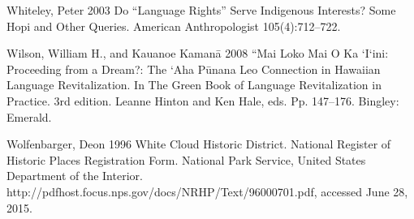 \documentclass[output=paper]{LSP/langsci}
\begin{document}
\begin{reflist}
Whiteley, Peter 2003 Do ``Language Rights'' Serve Indigenous Interests? Some Hopi and Other Queries. American Anthropologist 105(4):712--722.

Wilson, William H., and Kauanoe Kaman\=a 2008 ``Mai Loko Mai O Ka `I`ini: Proceeding from a Dream?: The `Aha P\=unana Leo Connection in Hawaiian Language Revitalization. In The Green Book of Language Revitalization in Practice. 3rd edition. Leanne Hinton and Ken Hale, eds. Pp. 147--176. Bingley: Emerald.

Wolfenbarger, Deon 1996 White Cloud Historic District. National Register of Historic Places Registration Form. National Park Service, United States Department of the Interior. http://pdfhost.focus.nps.gov/docs/NRHP/Text/96000701.pdf, accessed June 28, 2015.

\end{reflist}


\end{document}
